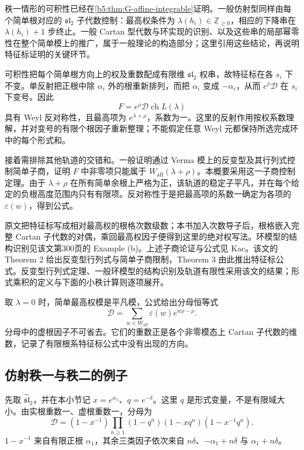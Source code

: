 \begin{proofsketch}
	秩一情形的可积性已经在\cref{b5:thm:G-affine-integrable}证明。一般仿射型同样由每个简单根对应的 \(\mathfrak{sl}_2\) 子代数控制：最高权条件为 \(\lambda(h_i)\in\mathbb Z_{\ge0}\)，相应的下降串在 \(\lambda(h_i)+1\) 步终止。一般 Cartan 型代数与环实现的识别、以及这些串的局部幂零性在整个简单模上的推广，属于一般理论的构造部分；这里引用这些结论，再说明特征标证明的关键环节。

	可积性把每个简单根方向上的权及重数配成有限维 \(\mathfrak{sl}_2\) 权串，故特征标在各 \(s_i\) 下不变。单反射把正根中除 \(\alpha_i\) 外的根重新排列，而把 \(\alpha_i\) 变成 \(-\alpha_i\)，从而 \(e^\rho\mathcal D\) 在 \(s_i\) 下变号。因此
	\[
		F=e^\rho\mathcal D\operatorname{ch}L(\lambda)
	\]
	具有 Weyl 反对称性，且最高项为 \(e^{\lambda+\rho}\)，系数为一。这里的反射作用按权系数理解，并对变号的有限个根因子重新整理；不能假定任意 Weyl 元都保持所选完成环中的每个形式和。

	接着需排除其他轨道的交错和。一般证明通过 Verma 模上的反变型及其行列式控制简单子商，证明 \(F\) 中非零项只能属于 \(W_{\mathrm{aff}}(\lambda+\rho)\)。本概要采用这一子商控制定理。由于 \(\lambda+\rho\) 在所有简单余根上严格为正，该轨道的稳定子平凡，并在每个给定的负根高度范围内只有有限项。反对称性于是把最高项的系数一确定为各项的 \(\varepsilon(w)\)，得到公式。

	原文把特征标写成相对最高权的根格次数级数；本书加入次数导子后，根格嵌入完整 Cartan 子代数的对偶，乘回最高权因子便得到这里的绝对权写法。环模型的结构识别见该文第300页的 Example (b)。上述子商论证与公式见 Kac\cite[Section 2, Theorems 2--3, pp. 300--301]{Kac1980HighestWeight}。该文的 Theorem 2 给出反变型行列式与简单子商限制，Theorem 3 由此推出特征标公式。反变型行列式定理、一般环模型的结构识别及轨道有限性采用该文的结果；形式乘积的定义与下面的小秩计算则逐项展开。
\end{proofsketch}

取 \(\lambda=0\) 时，简单最高权模是平凡模，公式给出分母恒等式
\[
	\mathcal D=\sum_{w\in W_{\mathrm{aff}}}\varepsilon(w)e^{w\rho-\rho}.
\]
分母中的虚根因子不可省去。它们的重数正是各个非零模态上 Cartan 子代数的维数，记录了有限根系特征标公式中没有出现的方向。

\subsection{仿射秩一与秩二的例子}
\label{b5:subsec:G04:03}

先取 \(\widehat{\mathfrak{sl}}_2\)，并在本小节记 \(x=e^{\alpha_1}\)、\(q=e^{-\delta}\)。这里 \(q\) 是形式变量，不是有限域大小。由实根重数一、虚根重数一，分母为
\begin{equation}\label{b5:eq:G-sl2-denominator}
	\mathcal D=(1-x^{-1})\prod_{n\ge1}(1-q^n)(1-xq^n)(1-x^{-1}q^n).
\end{equation}
\(1-x^{-1}\) 来自有限正根 \(\alpha_1\)，其余三类因子依次来自 \(n\delta\)、\(-\alpha_1+n\delta\) 与 \(\alpha_1+n\delta\)。

